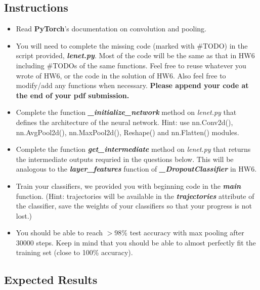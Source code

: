 \documentclass{article}
\begin{document}
\subsection{Instructions}
\begin{itemize}
\item Read \textbf{PyTorch}'s documentation on convolution and pooling.

\item You will need to complete the missing code (marked with \#TODO) in the script provided, \textbf{\textit{lenet.py}}.  Most of the code will be the same as that in HW6 including \#TODOs of the same functions. Feel free to reuse whatever you wrote of HW6, or the code in the solution of HW6. Also feel free to modify/add any functions when necessary. \textbf{Please append your code at the end of your pdf submission.}

\item Complete the function \textbf{\textit{\_initialize\_network}} method on \textit{lenet.py} that defines the architecture of the neural network. Hint: use nn.Conv2d(), nn.AvgPool2d(), nn.MaxPool2d(), Reshape() and nn.Flatten() modules.

\item Complete the function \textbf{\textit{get\_intermediate}} method on \textit{lenet.py} that returns the intermediate outputs requried in the questions below. This will be analogous to the \textbf{\textit{layer\_features}} function of  \textbf{\textit{\_DropoutClassifier}} in HW6.



\item Train your classifiers, we provided you with beginning code in the \textbf{\textit{main}} function. (Hint: trajectories will be available in the \textbf{\textit{trajectories}} attribute of the classifier, save the weights of your classifiers so that your progress is not lost.)

\item You should be able to reach  $>98\% $ test accuracy with max pooling after $30000$ steps. Keep in mind that you should be able to almost perfectly fit the training set (close to 100\% accuracy).

\end{itemize}

\subsection{Expected Results}
\end{document}
